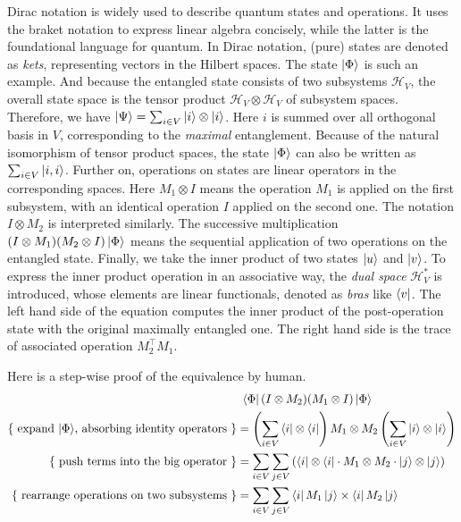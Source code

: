 Dirac notation is widely used to describe quantum states and operations. It uses the braket notation to express linear algebra concisely, while the latter is the foundational language for quantum.
In Dirac notation, (pure) states are denoted as \textit{kets}, representing vectors in the Hilbert spaces. The state $\ket{\Phi}$ is such an example. And because the entangled state consists of two subsystems $\mathcal{H}_V$, the overall state space is the tensor product $\mathcal{H}_V \otimes \mathcal{H}_V$ of subsystem spaces.
Therefore, we have $\ket{\Psi} = \sum_{i\in V} \ket{i} \otimes \ket{i}$. Here $i$ is summed over all orthogonal basis in $V$, corresponding to the \textit{maximal} entanglement. Because of the natural isomorphism of tensor product spaces, the state $\ket{\Phi}$ can also be written as $\sum_{i \in V} \ket{i, i}$. 
Further on, operations on states are linear operators in the corresponding spaces. Here $M_1 \otimes I$ means the operation $M_1$ is applied on the first subsystem, with an identical operation $I$ applied on the second one. The notation $I \otimes M_2$ is interpreted similarly. The successive multiplication $(I\otimes M_1)(M_2 \otimes I)\ket{\Phi}$ means the sequential application of two operations on the entangled state.
Finally, we take the inner product of two states $\ket{u}$ and $\ket{v}$. To express the inner product operation in an associative way, the \textit{dual space} $\mathcal{H}_V^*$ is introduced, whose elements are linear functionals, denoted as \textit{bras} like $\bra{v}$. The left hand side of the equation computes the inner product of the post-operation state with the original maximally entangled one. The right hand side is the trace of associated operation $M_2^\top M_1$.

Here is a step-wise proof of the equivalence by human.
\begin{align}
    & \ \bra{\Phi} (I \otimes M_2) (M_1 \otimes I) \ket{\Phi} \notag \\
    \text{\{ expand $\ket{\Phi}$, absorbing identity operators \}} & = \left(\sum_{i\in V} \bra{i} \otimes \bra{i}\right) M_1 \otimes M_2 \left(\sum_{i \in V} \ket{i} \otimes \ket{i}\right) \\
    \text{\{ push terms into the big operator \}} & = \sum_{i\in V} \sum_{j \in V} \left( \bra{i} \otimes \bra{i} \cdot  M_1 \otimes M_2 \cdot \ket{j} \otimes \ket{j} \right) \\
    \text{\{ rearrange operations on two subsystems \}} & = \sum_{i\in V} \sum_{j \in V} \bra{i} M_1 \ket{j} \times \bra{i} M_2 \ket{j}
\end{align}

